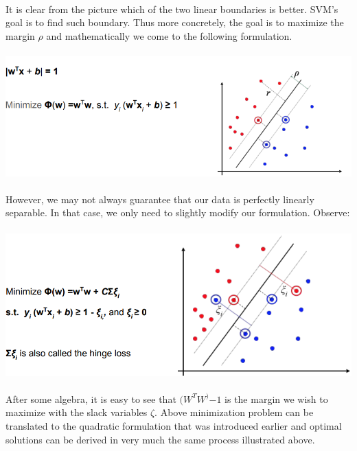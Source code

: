 \documentclass{article}
\begin{document}
\paragraph{}
It is clear from the picture which of the two linear boundaries is better. SVM's goal is to find such boundary. Thus more concretely, the goal is to maximize the margin $\rho$ and mathematically we come to the following formulation.
\paragraph{}
\includegraphics[scale=0.5]{bestmarginpic.PNG}
\\
\paragraph{}
However, we may not always guarantee that our data is perfectly linearly separable. In that case, we only need to slightly modify our formulation. Observe:\\
\paragraph{}
\includegraphics[scale=0.5]{bestmarginpic2.PNG}\\
\\
After some algebra, it is easy to see that $(W^{T}W^){-1}$ is the margin we wish to maximize with the slack variables $\zeta$. Above minimization problem can be translated to the quadratic formulation that was introduced earlier and optimal solutions can be derived in very much the same process illustrated above.
\end{document}
